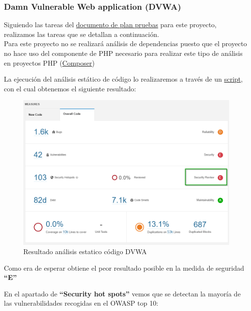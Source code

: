 \clearpage
\newpage

\subsubsection{Damn Vulnerable Web application (DVWA)}
Siguiendo las tareas del \href{https://github.com/M0l1n3ta/PFG/blob/master/Reportes/DVWA/PPR DVWA - Plan Pruebas de Seguridad.docx}{documento de plan pruebas}
para este proyecto, realizamos las tareas que se detallan a continuación.\\

Para este proyecto no se realizará análisis de dependencias puesto que el proyecto no hace uso del componente de PHP 
necesario para realizar este tipo de análisis en proyectos PHP (\href{https://getcomposer.org/}{Composer})

La ejecución del análisis estático de código lo realizaremos a través de un
\href{https://github.com/M0l1n3ta/PFG/blob/master/Scripts/STAT/RunSonarScaner_DWVA.ps1}{script}, con el cual obtenemos 
el siguiente resultado:\\

\begin{figure}[!htb]  
    \includegraphics[width=\linewidth]{./imagenes/07_AnalisisEstatico__DVWA.png}
    \caption{Resultado análisis estatico código DVWA}  
    \label{fig:22}
\end{figure}
Como era de esperar obtiene el peor resultado posible en la medida de seguridad \textbf{“E”}

\newpage
En el apartado de \textbf{“Security hot spots”} vemos que se detectan la mayoría de las 
vulnerabilidades recogidas en el OWASP top 10:

